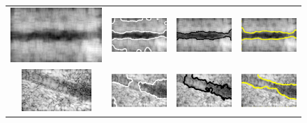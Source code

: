 \begin{figure}[t]
\begin{tabular}{@{}cccc@{}}
		\\
		\includegraphics[width=.23\linewidth]{./images/DL2S/compare/cylDPSS58_orig} &
		\includegraphics[width=.23\linewidth]{./images/DL2S/compare/cylDPSS58_CV} &
		\includegraphics[width=.23\linewidth]{./images/DL2S/compare/cylDPSS58_L2S_p2_c}&				
		\includegraphics[width=.23\linewidth]{./images/DL2S/compare/cylDPSS58_DL}
		\\
		\includegraphics[width=.23\linewidth]{./images/DL2S/compare/vessFIRvol10_orig} &
		\includegraphics[width=.23\linewidth]{./images/DL2S/compare/vessFIRvol10_CV} &
		\includegraphics[width=.23\linewidth]{./images/DL2S/compare/vessFIRvol10_L2S_p2_c} &
		\includegraphics[width=.23\linewidth]{./images/DL2S/compare/vessFIRvol10_DL} 

\end{tabular}
\end{figure}

